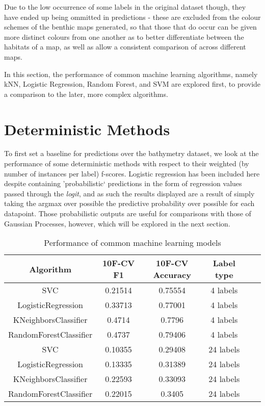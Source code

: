 Due to the low occurrence of some labels in the original dataset though, they have ended up being ommitted in predictions - these are excluded from the colour schemes of the benthic maps generated, so that those that do occur can be given more distinct colours from one another as to better differentiate between the habitats of a map, as well as allow a consistent comparison of across different maps.

In this section, the performance of common machine learning algorithms, namely kNN, Logistic Regression, Random Forest, and SVM are explored first, to provide a comparison to the later, more complex algorithms.


\pagebreak
\section{Deterministic Methods}

To first set a baseline for predictions over the bathymetry dataset, we look at the performance of some deterministic methods with respect to their weighted (by number of instances per label) f-scores. Logistic regression has been included here despite containing 'probabilistic` predictions in the form of regression values passed through the \textit{logit}, and as such the results displayed are a result of simply taking the argmax over possible the predictive probability over possible for each datapoint. Those probabilistic outputs are useful for comparisons with those of Gaussian Processes, however, which will be explored in the next section.

\begin{table}
    \centering
\begin{tabular}{|c|c|c|c|c|c|}
    \hline
    Algorithm & 10F-CV F1 & 10F-CV Accuracy & Label type\\\hline
    SVC & 0.21514 & 0.75554 & 4 labels \\
    LogisticRegression & 0.33713 & 0.77001 & 4 labels \\
    KNeighborsClassifier & 0.4714 & 0.7796 & 4 labels \\
    RandomForestClassifier & 0.4737 & 0.79406 & 4 labels \\
    SVC & 0.10355 & 0.29408 & 24 labels \\
    LogisticRegression & 0.13335 & 0.31389 & 24 labels \\
    KNeighborsClassifier & 0.22593 & 0.33093 & 24 labels \\
    RandomForestClassifier & 0.22015 & 0.3405 & 24 labels \\
    \hline
\end{tabular}
\label{table:detresults}
    \caption{Performance of common machine learning models}
\end{table}

